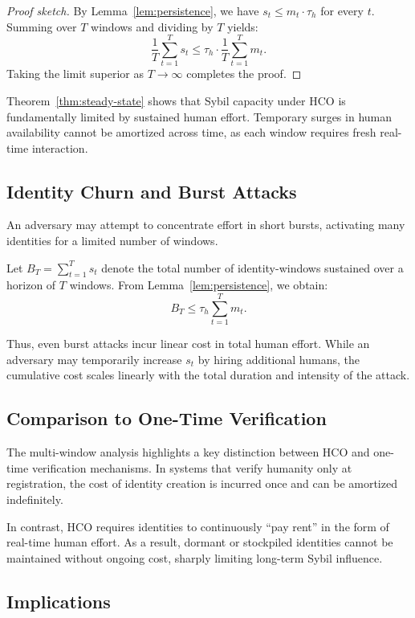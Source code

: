 \documentclass[sigconf,nonacm]{acmart}
\begin{document}
\begin{proof}[Proof sketch]
	By Lemma~\ref{lem:persistence}, we have $s_t \le m_t \cdot \tau_h$ for every $t$. Summing over $T$ windows and dividing by $T$ yields:
	\[
	\frac{1}{T} \sum_{t=1}^{T} s_t \le \tau_h \cdot \frac{1}{T} \sum_{t=1}^{T} m_t.
	\]
	Taking the limit superior as $T \to \infty$ completes the proof.
\end{proof}

Theorem~\ref{thm:steady-state} shows that Sybil capacity under HCO is fundamentally limited by sustained human effort. Temporary surges in human availability cannot be amortized across time, as each window requires fresh real-time interaction.

\subsection{Identity Churn and Burst Attacks}

An adversary may attempt to concentrate effort in short bursts, activating many identities for a limited number of windows.

Let $B_T = \sum_{t=1}^{T} s_t$ denote the total number of identity-windows sustained over a horizon of $T$ windows. From Lemma~\ref{lem:persistence}, we obtain:
\[
B_T \le \tau_h \sum_{t=1}^{T} m_t.
\]

Thus, even burst attacks incur linear cost in total human effort. While an adversary may temporarily increase $s_t$ by hiring additional humans, the cumulative cost scales linearly with the total duration and intensity of the attack.

\subsection{Comparison to One-Time Verification}

The multi-window analysis highlights a key distinction between HCO and one-time verification mechanisms. In systems that verify humanity only at registration, the cost of identity creation is incurred once and can be amortized indefinitely.

In contrast, HCO requires identities to continuously ``pay rent'' in the form of real-time human effort. As a result, dormant or stockpiled identities cannot be maintained without ongoing cost, sharply limiting long-term Sybil influence.

\subsection{Implications}
\end{document}
